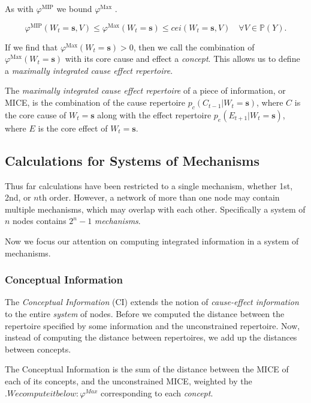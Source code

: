 As with $\varphi^{\text{MIP}}$ we bound $\varphi^{\text{Max}}$ \cite{marshall2016integrated}. 

\begin{equation}
\label{eq:bound_phimax}
\varphi^{\text{MIP}}(W_t = \mathbf{s}, V) \leq \varphi^{\text{Max}}(W_t = \mathbf{s})\leq cei(W_t = \mathbf{s}, V) \quad \forall V \in \mathbb{P}(Y).
\end{equation}

If we find that $\varphi^{\text{Max}}(W_t =\mathbf{s})>0$, then we call the combination of $\varphi^{\text{Max}}(W_t = \mathbf{s})$ with its core cause and effect a \textit{concept}. This allows us to define a \textit{maximally integrated cause effect repertoire}.

\begin{definition}
	{The \textit{maximally integrated cause effect repertoire} of a piece of information, or MICE, is the combination of the cause repertoire $p_c(C_{t-1}|W_t = \mathbf{s})$, where $C$ is the core cause of $W_t=\mathbf{s}$ along with the effect repertoire $p_e(E_{t+1}|W_t = \mathbf{s})$, where $E$ is the core effect of $W_t = \mathbf{s}$.}
\end{definition}

\subsection{Calculations for Systems of Mechanisms}
\label{sec:systems}
Thus far calculations have been restricted to a single mechanism, whether 1st, 2nd, or $n$th order. However, a network of more than one node may contain multiple mechanisms, which may overlap with each other. Specifically a system of $n$ nodes contains $2^n-1$ \textit{mechanisms}.

Now we focus our attention on computing integrated information in a system of mechanisms. 

\subsubsection{Conceptual Information}
\label{sec:CI}
The \textit{Conceptual Information} (CI)\cite{oizumi2014phenomenology}  extends the notion of \textit{cause-effect information} to the entire \textit{system} of nodes. Before we computed the distance between the repertoire specified by some information and the unconstrained repertoire. Now, instead of computing the distance between repertoires, we add up the distances between concepts.

The Conceptual Information is the sum of the distance between the MICE of each of its concepts, and the unconstrained MICE, weighted by the $. We compute it below:
\varphi^{\textit{Max}}$ corresponding to each \textit{concept}.

